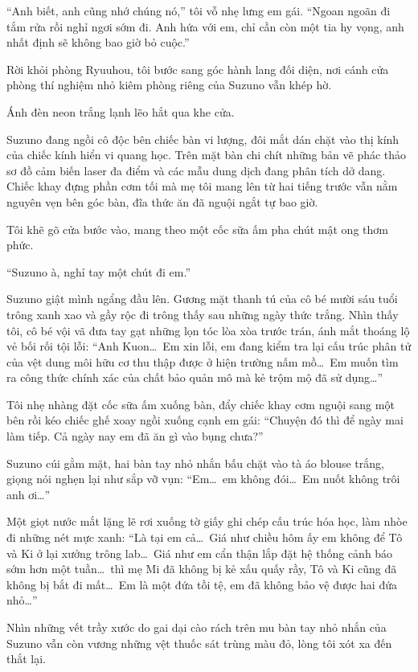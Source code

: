 \documentclass[../main.tex]{subfiles}
\begin{document}
``Anh biết, anh cũng nhớ chúng nó,'' tôi vỗ nhẹ lưng em gái. ``Ngoan ngoãn đi tắm rửa rồi nghỉ ngơi sớm đi. Anh hứa với em, chỉ cần còn một tia hy vọng, anh nhất định sẽ không bao giờ bỏ cuộc.''

\ct

Rời khỏi phòng Ryuuhou, tôi bước sang góc hành lang đối diện, nơi cánh cửa phòng thí nghiệm nhỏ kiêm phòng riêng của Suzuno vẫn khép hờ.

Ánh đèn neon trắng lạnh lẽo hắt qua khe cửa.

Suzuno đang ngồi cô độc bên chiếc bàn vi lượng, đôi mắt dán chặt vào thị kính của chiếc kính hiển vi quang học. Trên mặt bàn chi chít những bản vẽ phác thảo sơ đồ cảm biến laser đa điểm và các mẫu dung dịch đang phân tích dở dang. Chiếc khay đựng phần cơm tối mà mẹ tôi mang lên từ hai tiếng trước vẫn nằm nguyên vẹn bên góc bàn, đĩa thức ăn đã nguội ngắt tự bao giờ.

Tôi khẽ gõ cửa bước vào, mang theo một cốc sữa ấm pha chút mật ong thơm phức.

``Suzuno à, nghỉ tay một chút đi em.''

Suzuno giật mình ngẩng đầu lên. Gương mặt thanh tú của cô bé mười sáu tuổi trông xanh xao và gầy rộc đi trông thấy sau những ngày thức trắng. Nhìn thấy tôi, cô bé vội vã đưa tay gạt những lọn tóc lòa xòa trước trán, ánh mắt thoáng lộ vẻ bối rối tội lỗi: ``Anh Kuon\dots\ Em xin lỗi, em đang kiểm tra lại cấu trúc phân tử của vệt dung môi hữu cơ thu thập được ở hiện trường nấm mồ\dots\ Em muốn tìm ra công thức chính xác của chất bảo quản mô mà kẻ trộm mộ đã sử dụng\dots''

Tôi nhẹ nhàng đặt cốc sữa ấm xuống bàn, đẩy chiếc khay cơm nguội sang một bên rồi kéo chiếc ghế xoay ngồi xuống cạnh em gái: ``Chuyện đó thì để ngày mai làm tiếp. Cả ngày nay em đã ăn gì vào bụng chưa?''

Suzuno cúi gằm mặt, hai bàn tay nhỏ nhắn bấu chặt vào tà áo blouse trắng, giọng nói nghẹn lại như sắp vỡ vụn: ``Em\dots\ em không đói\dots\ Em nuốt không trôi anh ơi\dots''

Một giọt nước mắt lặng lẽ rơi xuống tờ giấy ghi chép cấu trúc hóa học, làm nhòe đi những nét mực xanh: ``Là tại em cả\dots\ Giá như chiều hôm ấy em không để Tô và Ki ở lại xưởng trông lab\dots\ Giá như em cẩn thận lắp đặt hệ thống cảnh báo sớm hơn một tuần\dots\ thì mẹ Mi đã không bị kẻ xấu quấy rầy, Tô và Ki cũng đã không bị bắt đi mất\dots\ Em là một đứa tồi tệ, em đã không bảo vệ được hai đứa nhỏ\dots''

Nhìn những vết trầy xước do gai dại cào rách trên mu bàn tay nhỏ nhắn của Suzuno vẫn còn vương những vệt thuốc sát trùng màu đỏ, lòng tôi xót xa đến thắt lại.
\end{document}
